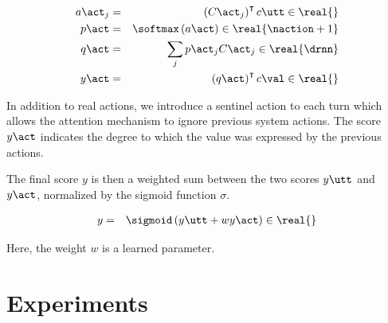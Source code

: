 \documentclass[11pt,a4paper]{article}
\begin{document}
\begin{eqnarray}
a\act_j &=& \left( C\act_j \right) ^ \intercal c\utt \in \real{} \\
p\act &=& \softmax \left( a\act \right) \in \real{\naction + 1} \\
q\act &=& \sum_j p\act_j C\act_j \in \real{\drnn} \\
\label{eq:actscore}
y\act &=& \left( q\act \right) ^ \intercal c\val \in \real{}
\end{eqnarray}

In addition to real actions, we introduce a sentinel action to each turn which allows the attention mechanism to ignore previous system actions.
The score $y\act$ indicates the degree to which the value was expressed by the previous actions.

The final score $y$ is then a weighted sum between the two scores $y\utt$ and $y\act$, normalized by the sigmoid function $\sigma$.

\begin{eqnarray}
\label{eq:score}
y &=& \sigmoid \left( y\utt + w y\act \right) \in \real{}
\end{eqnarray}

Here, the weight $w$ is a learned parameter.






\section{Experiments}
\end{document}
